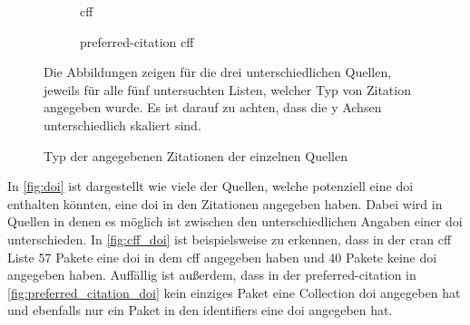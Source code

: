\begin{figure}
    \begin{subfigure}{.5\textwidth}
        \centering
        
        \caption{\gls{cff}}
        \label{fig:citation_counts_cff}
    \end{subfigure}%
    \begin{subfigure}{.5\textwidth}
        \centering
        
        \caption{\glqq preferred-citation\grqq{} \gls{cff}}
        \label{fig:citation_counts_preferred_citation_cff}
    \end{subfigure}
    \centering
    \begin{subfigure}{.5\textwidth}
        \centering
        
        \caption{}
        \label{fig:citation_counts_bib}
    \end{subfigure}
    \caption{Typ der angegebenen Zitationen der einzelnen Quellen}
    \label{fig:citation_counts}
    \small
    \raggedright
    Die Abbildungen zeigen für die drei unterschiedlichen Quellen, jeweils für alle fünf untersuchten Listen, welcher Typ von Zitation angegeben wurde. Es ist darauf zu achten, dass die y Achsen unterschiedlich skaliert sind.
\end{figure}

In \autoref{fig:doi} ist dargestellt wie viele der Quellen, welche potenziell eine \gls{doi} enthalten könnten, eine \gls{doi} in den Zitationen angegeben haben.
Dabei wird in Quellen in denen es möglich ist zwischen den unterschiedlichen Angaben einer \gls{doi} unterschieden.
In \autoref{fig:cff_doi} ist beispielsweise zu erkennen, dass in der \gls{cran} \gls{cff} Liste 57 Pakete eine \gls{doi} in dem \gls{cff} angegeben haben und 40 Pakete keine \gls{doi} angegeben haben.
Auffällig ist außerdem, dass in der \glqq preferred-citation\grqq{} in \autoref{fig:preferred_citation_doi} kein einziges Paket eine Collection \gls{doi} angegeben hat und ebenfalls nur ein Paket in den \glqq identifiers\grqq{} eine \gls{doi} angegeben hat.

